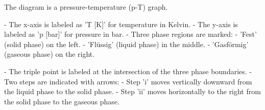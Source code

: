 The diagram is a pressure-temperature (p-T) graph.  

- The x-axis is labeled as 'T [K]' for temperature in Kelvin.  
- The y-axis is labeled as 'p [bar]' for pressure in bar.  
- Three phase regions are marked:  
  - 'Fest' (solid phase) on the left.  
  - 'Flüssig' (liquid phase) in the middle.  
  - 'Gasförmig' (gaseous phase) on the right.  

- The triple point is labeled at the intersection of the three phase boundaries.  
- Two steps are indicated with arrows:  
  - Step 'i' moves vertically downward from the liquid phase to the solid phase.  
  - Step 'ii' moves horizontally to the right from the solid phase to the gaseous phase.